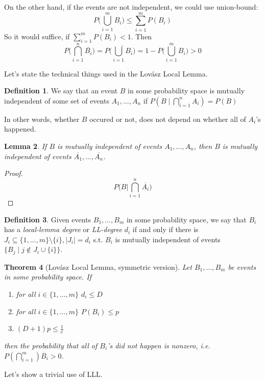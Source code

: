 \documentclass{article}
\theoremstyle{plain}
\newtheorem{thm}{Theorem}[section]
\newtheorem{lem}[thm]{Lemma}
\theoremstyle{definition}
\newtheorem{defn}[thm]{Definition}
\begin{document}
On the other hand, if the events are not independent, we could use union-bound:
$$
P\bigg(\bigcup_{i=1}^mB_i\bigg) \leq \sum_{i=1}^mP(B_i)
$$
So it would suffice, if $\sum_{i=1}^mP(B_i)<1$. Then 
$$
P\bigg(\bigcap_{i=1}^n \overline{B_i}\bigg) = P\bigg(\overline{\bigcup_{i=1}B_i}\bigg)=1-P\bigg(\bigcup_{i=1}^mB_i\bigg)>0
$$



Let's state the technical things used in the Lovász Local Lemma.

\begin{defn}
	We say that an event $B$ in some probability space is mutually independent of some set of events $A_1,\ldots, A_n$ if $P(B\mid \bigcap_{i=1}^nA_i)=P(B)$
\end{defn}
In other words, whether $B$ occured or not, does not depend on whether all of $A_i$'s happened.


\begin{lem}
If $B$ is mutually independent of events $A_1,\ldots, A_n$, then $B$ is mutually independent of events $\overline{A_1},\ldots, \overline{A_n}$.
\end{lem}
\begin{proof}
	$$
	P\bigg(B\bigg| \bigcap_{i=1}^n \overline{A_i}\bigg)
	$$
\end{proof}

\begin{defn}
	Given events $B_1,\ldots, B_m$ in some probability space, we say that $B_i$ has a \textit{local-lemma degree} or \textit{LL-degree} $d_i$ if and only if there is $J_i\subseteq \{1,\ldots, m\}\setminus \{i\},|J_i|=d_i$ s.t. $B_i$ is mutually independent of events $\{B_j \mid j \notin J_i\cup \{i\}\}$.
\end{defn}

\begin{thm}[Lovász Local Lemma, symmetric version]
	Let $B_1,\ldots, B_m$ be events in some probability space. If
	\begin{enumerate}
		\item for all $i\in\{1,\ldots,m\}$ $d_i\leq D$
		\item for all $i\in\{1,\ldots, m\}$ $P(B_i)\leq p$
		\item $(D+1)p\leq \frac{1}{e}$
	\end{enumerate}
	then the probability that all of $B_i$'s did not happen is nonzero, i.e. $P(\bigcap_{i=1}^m)\overline{B_i}>0$.
\end{thm}

Let's show a trivial use of LLL.
\end{document}
